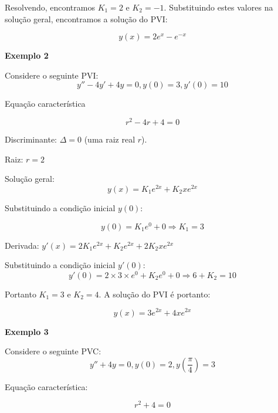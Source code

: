 \documentclass[a4paper]{article}
\begin{document}
\begin{multicols}{2}
Resolvendo, encontramos $K_1=2$ e $K_2=-1$. Substituindo estes valores
na solução geral, encontramos a solução do PVI:

\begin{displaymath}
  y(x) =  2e^x -e^{-x}
\end{displaymath}

\hrulefill

{\bf Exemplo 2}

Considere o seguinte PVI:
\begin{displaymath}
  y''-4y' +4y=0, y(0)=3, y'(0)=10
\end{displaymath}

Equação característica

\begin{displaymath}
  r^2-4r+4=0
\end{displaymath}

Discriminante: $\Delta=0$ (uma raiz real $r$).

Raiz: $r=2$

Solução geral:
\begin{displaymath}
  y(x) = K_1e^{2x} + K_2xe^{2x}
\end{displaymath}

Substituindo a condição inicial $y(0)$:

\begin{displaymath}
  y(0) = K_1e^0 + 0 \Rightarrow K_1=3
\end{displaymath}

Derivada: $y'(x) = 2K_1e^{2x} + K_2e^{2x} + 2K_2xe^{2x}$

Substituindo a condição inicial $y'(0)$:
\begin{displaymath}
  y'(0) = 2\times 3\times e^0 + K_2e^0 + 0 \Rightarrow 6+ K_2=10
\end{displaymath}

Portanto $K_1=3$ e $K_2=4$. A solução do PVI é portanto:

\begin{displaymath}
  y(x) = 3e^{2x} + 4xe^{2x}
\end{displaymath}

\hrulefill

{\bf Exemplo 3}

Considere o seguinte PVC:
\begin{displaymath}
  y''+4y=0, y(0)=2, y(\frac{\pi}{4})=3
\end{displaymath}

Equação característica:

\begin{displaymath}
  r^2+4=0
\end{displaymath}


\end{multicols}
\end{document}
